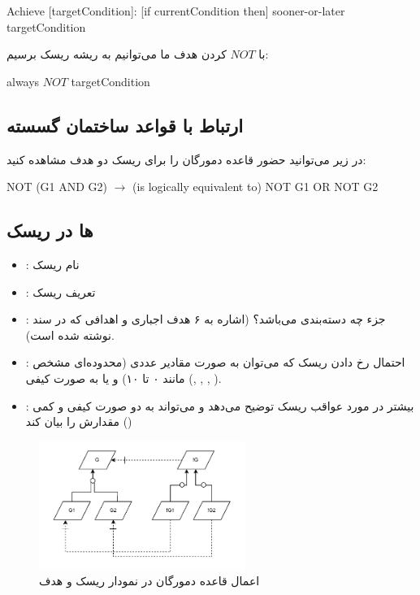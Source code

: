 \begin{LTR}
    Achieve [targetCondition]: [if currentCondition then] sooner-or-later targetCondition
\end{LTR}

با $NOT$ کردن هدف ما می‌توانیم به ریشه ریسک برسیم:

\begin{LTR}
     always $NOT$ targetCondition
\end{LTR}

\subsection{ارتباط با قواعد ساختمان گسسته}

در زیر می‌توانید حضور قاعده دمورگان را برای ریسک دو هدف مشاهده کنید:

\begin{LTR}
    NOT (G1 AND G2) $\rightarrow$ (is logically equivalent to) NOT G1 OR NOT G2
\end{LTR}

\subsection{ها در ریسک}

\begin{itemize}
    \item {}: نام ریسک
    \item {}: تعریف ریسک
    \item {}: جزء چه دسته‌بندی می‌باشد؟ (اشاره به ۶ هدف اجباری و
    اهدافی که در سند نوشته شده است).
    \item {}: احتمال رخ دادن ریسک که می‌توان به صورت مقادیر عددی
    (محدوده‌ای مشخص مانند ۰ تا ۱۰) و یا به صورت کیفی (,
    , , ).
    \item {}: بیشتر در مورد عواقب ریسک توضیح می‌دهد و می‌تواند به
    دو صورت کیفی و کمی مقدارش را بیان کند ()
\end{itemize}

\begin{figure}[H]
    \centering
    \includegraphics[width=0.6\textwidth]{assets/de-morgan.drawio.pdf}
    \caption{اعمال قاعده دمورگان در نمودار ریسک و هدف}
\end{figure}

